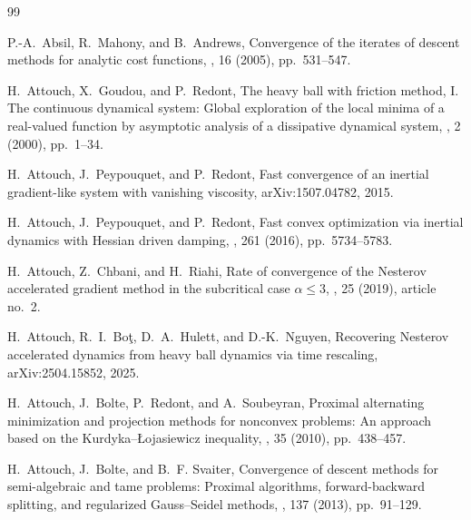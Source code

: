 \documentclass{article}
\theoremstyle{remark}
\begin{document}
\begin{thebibliography}{99}

{\sc P.-A.~Absil, R.~Mahony, and B.~Andrews},
\newblock Convergence of the iterates of descent methods for analytic cost functions,
, 16 (2005), pp.~531--547.

{\sc H.~Attouch, X.~Goudou, and P.~Redont},
\newblock The heavy ball with friction method, {I}. The continuous dynamical system: Global exploration of the local minima of a real-valued function by asymptotic analysis of a dissipative dynamical system,
, 2 (2000), pp.~1--34.

{\sc H.~Attouch, J.~Peypouquet, and P.~Redont},
\newblock Fast convergence of an inertial gradient-like system with vanishing viscosity,
 arXiv:1507.04782, 2015.

{\sc H.~Attouch, J.~Peypouquet, and P.~Redont},
\newblock Fast convex optimization via inertial dynamics with {H}essian driven damping,
, 261 (2016), pp.~5734--5783.


{\sc H.~Attouch, Z.~Chbani, and H.~Riahi},
\newblock Rate of convergence of the {N}esterov accelerated gradient method in the subcritical case {$\alpha\le 3$},
, 25 (2019), article no.~2.

{\sc H.~Attouch, R.~I.~Bo{\c t}, D.~A.~Hulett, and D.-K.~Nguyen},
\newblock Recovering {N}esterov accelerated dynamics from heavy ball dynamics via time rescaling,
 arXiv:2504.15852, 2025.

{\sc H.~Attouch, J.~Bolte, P.~Redont, and A.~Soubeyran},
\newblock Proximal alternating minimization and projection methods for nonconvex problems: An approach based on the {K}urdyka--{\L}ojasiewicz inequality,
, 35 (2010), pp.~438--457.

{\sc H.~Attouch, J.~Bolte, and B.~F. Svaiter},
\newblock Convergence of descent methods for semi-algebraic and tame problems: Proximal algorithms, forward-backward splitting, and regularized {G}auss--{S}eidel methods,
, 137 (2013), pp.~91--129.


\end{thebibliography}
\end{document}
